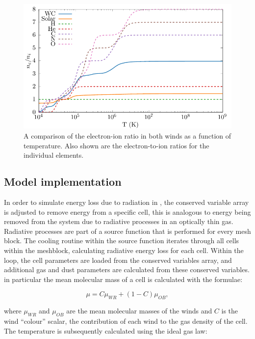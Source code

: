 \begin{figure}[h]
  \centering
  \includegraphics{assets/ionisation-fraction/ionisation-fraction.pdf}
  \caption[OB and WR electron-ion ratios]{A comparison of the electron-ion ratio in both winds as a function of temperature. Also shown are the electron-to-ion ratios for the individual elements.}
  \label{fig:electron-curve-no-elements}
\end{figure}

\subsection{Model implementation}
\label{sec:cooling-implementation}

In order to simulate energy loss due to radiation in \athena{}, the conserved variable array is adjusted to remove energy from a specific cell, this is analogous to energy being removed from the system due to radiative processes in an optically thin gas.
Radiative processes are part of a source function that is performed for every mesh block.
The cooling routine within the source function iterates through all cells within the meshblock, calculating radiative energy loss for each cell.
Within the loop, the cell parameters are loaded from the conserved variables array, and additional gas and dust parameters are calculated from these conserved variables.
in particular the mean molecular mass of a cell is calculated with the formulae:

\begin{equation}
  \mu = C\mu_{WR} + (1-C) \mu_{OB}, \label{eq:windaveraging}
\end{equation}

\noindent
where $\mu_{WR}$ and $\mu_{OB}$ are the mean molecular masses of the winds and $C$ is the wind ``colour'' scalar, the contribution of each wind to the gas density of the cell.
The temperature is subsequently calculated using the ideal gas law:

